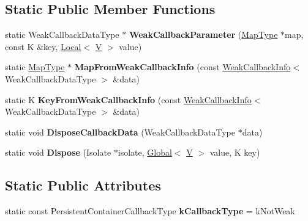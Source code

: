 \subsection*{Static Public Member Functions}
\begin{DoxyCompactItemize}
\item 
\mbox{\label{classv8_1_1DefaultPersistentValueMapTraits_a63b6fc80207ce6ac7d1eaa306b68768c}} 
static Weak\+Callback\+Data\+Type $\ast$ {\bfseries Weak\+Callback\+Parameter} (\mbox{\hyperlink{classv8_1_1PersistentValueMap}{Map\+Type}} $\ast$map, const K \&key, \mbox{\hyperlink{classv8_1_1Local}{Local}}$<$ \mbox{\hyperlink{classV}{V}} $>$ value)
\item 
\mbox{\label{classv8_1_1DefaultPersistentValueMapTraits_ad5a476677abdec41871199920820e8bd}} 
static \mbox{\hyperlink{classv8_1_1PersistentValueMap}{Map\+Type}} $\ast$ {\bfseries Map\+From\+Weak\+Callback\+Info} (const \mbox{\hyperlink{classv8_1_1WeakCallbackInfo}{Weak\+Callback\+Info}}$<$ Weak\+Callback\+Data\+Type $>$ \&data)
\item 
\mbox{\label{classv8_1_1DefaultPersistentValueMapTraits_a9d757cce8008b477a513c6d30a2b6328}} 
static K {\bfseries Key\+From\+Weak\+Callback\+Info} (const \mbox{\hyperlink{classv8_1_1WeakCallbackInfo}{Weak\+Callback\+Info}}$<$ Weak\+Callback\+Data\+Type $>$ \&data)
\item 
\mbox{\label{classv8_1_1DefaultPersistentValueMapTraits_a9e5c3a4a054b13f46065adec2c44ddfe}} 
static void {\bfseries Dispose\+Callback\+Data} (Weak\+Callback\+Data\+Type $\ast$data)
\item 
\mbox{\label{classv8_1_1DefaultPersistentValueMapTraits_a28f1a2d349eb5a6ad376b6e968d51490}} 
static void {\bfseries Dispose} (Isolate $\ast$isolate, \mbox{\hyperlink{classv8_1_1Global}{Global}}$<$ \mbox{\hyperlink{classV}{V}} $>$ value, K key)
\end{DoxyCompactItemize}
\subsection*{Static Public Attributes}
\begin{DoxyCompactItemize}
\item 
\mbox{\label{classv8_1_1DefaultPersistentValueMapTraits_a1f57d8246e4ace68bc9be1047eb7cc40}} 
static const Persistent\+Container\+Callback\+Type {\bfseries k\+Callback\+Type} = k\+Not\+Weak
\end{DoxyCompactItemize}


